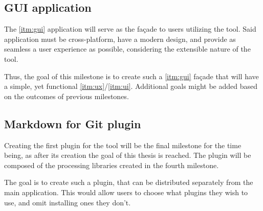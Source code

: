 \subsection*{GUI application} \label{subSecGuiApp}

The \ref{itm:gui} application will serve as the façade to users utilizing the tool. Said application must be cross-platform, have a modern design, and provide as seamless a user experience as possible, considering the extensible nature of the tool.

Thus, the goal of this milestone is to create such a \ref{itm:gui} façade that will have a simple, yet functional \ref{itm:ux}/\ref{itm:ui}. Additional goals might be added based on the outcomes of previous milestones.

\subsection*{Markdown for Git plugin} \label{subSecMdGitPlugin}

Creating the first plugin for the tool will be the final milestone for the time being, as after its creation the goal of this thesis is reached.
The plugin will be composed of the processing libraries created in the fourth milestone.

The goal is to create such a plugin, that can be distributed separately from the main application. This would allow users to choose what plugins they wish to use, and omit installing ones they don't.
